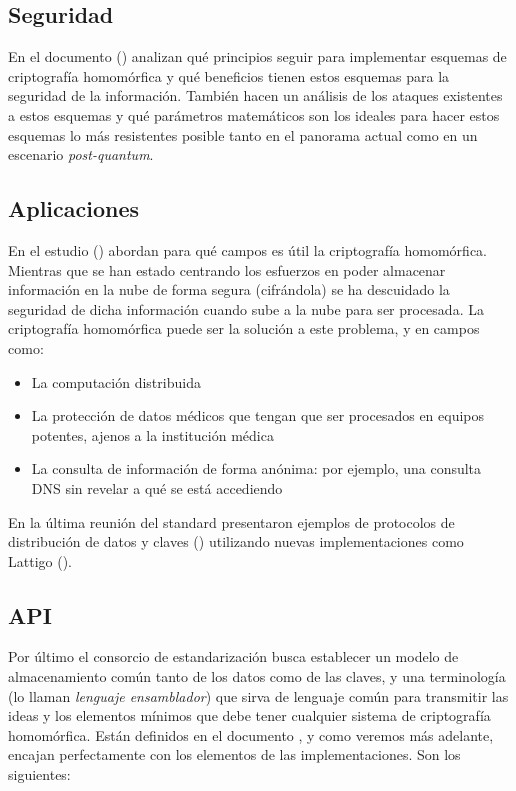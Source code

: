 \subsection{Seguridad}

En el documento (\cite{chase_security_2017}) analizan qué principios seguir para implementar esquemas de criptografía homomórfica y qué beneficios tienen estos esquemas para la seguridad de la información. También hacen un análisis de los ataques existentes a estos esquemas y qué parámetros matemáticos son los ideales para hacer estos esquemas lo más resistentes posible tanto en el panorama actual como en un escenario \textit{post-quantum}.

\subsection{Aplicaciones}

En el estudio (\cite{archer_applications_2017}) abordan para qué campos es útil la criptografía homomórfica. Mientras que se han estado centrando los esfuerzos en poder almacenar información en la nube de forma segura (cifrándola) se ha descuidado la seguridad de dicha información cuando sube a la nube para ser procesada. La criptografía homomórfica puede ser la solución a este problema, y en campos como:

\begin{itemize}
    \item La computación distribuida
    \item La protección de datos médicos que tengan que ser procesados en equipos potentes, ajenos a la institución médica
    \item La consulta de información de forma anónima: por ejemplo, una consulta DNS sin revelar a qué se está accediendo
\end{itemize}

En la última reunión del standard presentaron ejemplos de protocolos de distribución de datos y claves (\cite{troncoso-pastoriza_homomorphic_nodate}) utilizando nuevas implementaciones como Lattigo (\cite{noauthor_lattigo_2019}).

\subsection{API}

Por último el consorcio de estandarización busca establecer un modelo de almacenamiento común tanto de los datos como de las claves, y una terminología (lo llaman \textit{lenguaje ensamblador}) que sirva de lenguaje común para transmitir las ideas y los elementos mínimos que debe tener cualquier sistema de criptografía homomórfica. Están definidos en el documento \cite{brenner_standard_2017}, y como veremos más adelante, encajan perfectamente con los elementos de las implementaciones. Son los siguientes:

